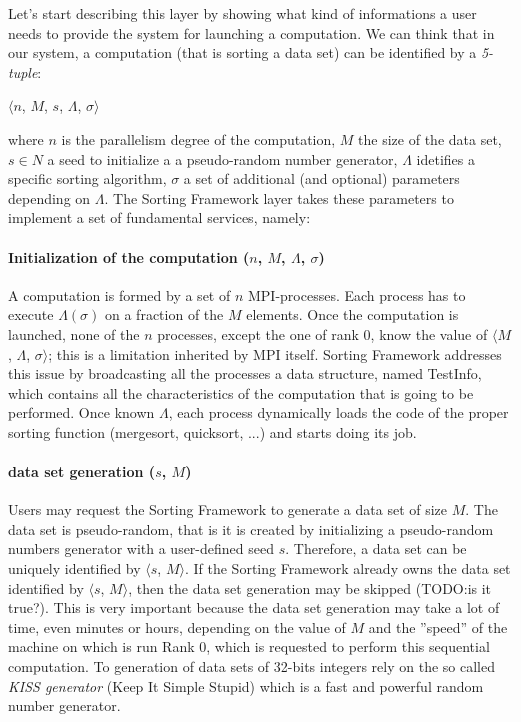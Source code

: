 Let's start describing this layer by showing what kind of informations a user needs to provide the system for launching a computation. We can think that in our system, a computation (that is sorting a data set) can be identified by a \textit{5-tuple}:
\begin{center}
$\langle n$, $M$, $s$, $\Lambda$, $\sigma \rangle$
\end{center} 
where $n$ is the parallelism degree of the computation, $M$ the size of the data set, $s \in N$ a seed to initialize a a pseudo-random number generator, $\Lambda$ idetifies a specific sorting algorithm, $\sigma$ a set of additional (and optional) parameters depending on $\Lambda$.
The Sorting Framework layer takes these parameters to implement a set of fundamental services, namely: 

\paragraph{Initialization of the computation ($n$, $M$, $\Lambda$, $\sigma$)} A computation is formed by a set of $n$ MPI-processes. Each process has to execute $\Lambda(\sigma)$ on a fraction of the $M$ elements. Once the computation is launched, none of the $n$ processes, except the one of rank $0$, know the value of $\langle M$, $\Lambda$, $\sigma \rangle$; this is a limitation inherited by MPI itself. Sorting Framework addresses this issue by broadcasting all the processes a data structure, named TestInfo, which contains all the characteristics of the computation that is going to be performed. Once known $\Lambda$, each process dynamically loads the code of the proper sorting function (mergesort, quicksort, ...) and starts doing its job.  
\paragraph{data set generation ($s$, $M$)} Users may request the Sorting Framework to generate a data set of size $M$. The data set is pseudo-random, that is it is created by initializing a pseudo-random numbers generator with a user-defined seed $s$. Therefore, a data set can be uniquely identified by $\langle s$, $M \rangle$. If the Sorting Framework already owns the data set identified by $\langle s$, $M \rangle$, then the data set generation may be skipped (TODO:is it true?). This is very important because the data set generation may take a lot of time, even minutes or hours, depending on the value of $M$ and the ''speed'' of the machine on which is run Rank $0$, which is requested to perform this sequential computation. To generation of data sets of 32-bits integers rely on the so called \textit{KISS generator} (Keep It Simple Stupid) which is a fast and powerful random number generator.

